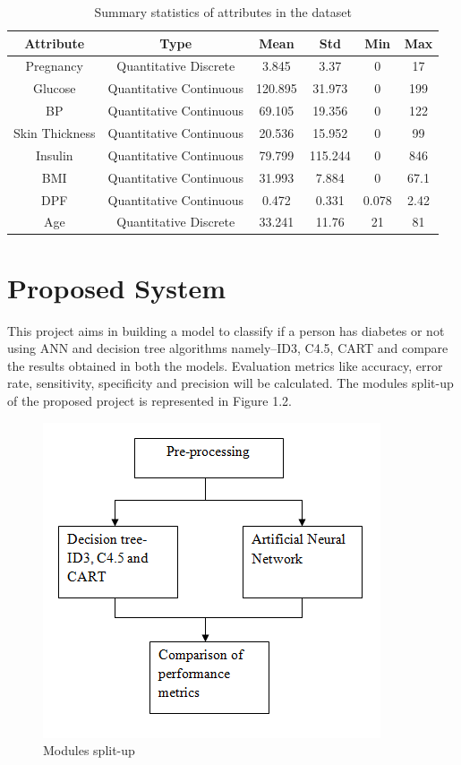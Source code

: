 \begin{table}[h]
\begin{center}
\begin{tabular}{| c | c | c | c | c | c |}
  \hline
  \textbf{Attribute} & \textbf{Type} & \textbf{Mean} & \textbf{Std} & \textbf{Min} & \textbf{Max} \\[2.5ex]
  \hline

  Pregnancy & Quantitative Discrete & 3.845 & 3.37 & 0 & 17  \\[2.5ex]
  \hline
  Glucose & Quantitative Continuous & 120.895 & 31.973 & 0 & 199  \\[2.5ex]
  \hline
  BP & Quantitative Continuous & 69.105 & 19.356 & 0 & 122  \\[2.5ex]
  \hline
  Skin Thickness & Quantitative Continuous & 20.536 & 15.952 & 0 & 99  \\[2.5ex]
  \hline
  Insulin & Quantitative Continuous & 79.799 & 115.244 & 0 & 846  \\[2.5ex]
  \hline
  BMI & Quantitative Continuous & 31.993 & 7.884 & 0 & 67.1  \\[2.5ex]
  \hline
  DPF & Quantitative Continuous & 0.472 & 0.331 & 0.078 & 2.42  \\[2.5ex]
  \hline
   Age & Quantitative Discrete & 33.241 & 11.76 & 21 & 81  \\[2.5ex]
  \hline 
\end{tabular}
\end{center}
\caption{\label{table:TT}Summary statistics of attributes in the dataset}
\end{table}
\section{Proposed System}
This project aims in building a model to classify if a person has  diabetes or not
using ANN and decision tree algorithms namely--ID3, C4.5, CART and compare the results obtained in both the models. Evaluation metrics like accuracy, error rate, sensitivity, specificity and precision will be calculated. The modules split-up of the proposed project is represented in Figure 1.2.
\begin{figure}[h]
\centering %
\includegraphics[scale=1.15]{modules.png}
\caption{\label{fig:subBDDs1}Modules split-up}
\end{figure}
\pagebreak
